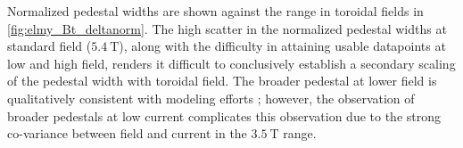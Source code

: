 \begin{figure}[p]
 \pushtooutside
\end{figure}

Normalized pedestal widths are shown against the range in toroidal fields in \cref{fig:elmy_Bt_deltanorm}.  The high scatter in the normalized pedestal widths at standard field ($\SI{5.4}{\tesla}$), along with the difficulty in attaining usable datapoints at low and high field, renders it difficult to conclusively establish a secondary scaling of the pedestal width with toroidal field.  The broader pedestal at lower field is qualitatively consistent with modeling efforts \cite{Maggi2010,Chang2004}; however, the observation of broader pedestals at low current \cite{Hughes2007} complicates this observation due to the strong co-variance between field and current in the $\SI{3.5}{\tesla}$ range.

